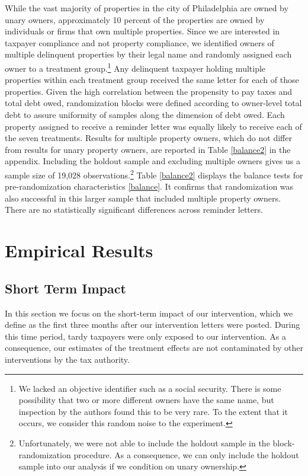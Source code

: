 \documentclass[12pt]{article}
\begin{document}
While the vast majority of properties in the city of Philadelphia are
owned by unary owners, approximately 10 percent of the properties are
owned by individuals or firms that own multiple properties. Since we
are interested in taxpayer compliance and not property compliance, we
identified owners of multiple delinquent properties by their legal
name and randomly assigned each owner to a treatment
group.\footnote{We lacked an objective identifier such as a social
  security.  There is some possibility that two or more different
  owners have the same name, but inspection by the authors found this
  to be very rare.  To the extent that it occurs, we consider this
  random noise to the experiment.} Any delinquent taxpayer holding
multiple properties within each treatment group received the same
letter for each of those properties.  Given the high correlation
between the propensity to pay taxes and total debt owed, randomization
blocks were defined according to owner-level total debt to assure
uniformity of samples along the dimension of debt owed. Each property
assigned to receive a reminder letter was equally likely to receive
each of the seven treatments. Results for multiple property owners,
which do not differ from results for unary property owners, are
reported in Table \ref{balance2} in the appendix.  Including the
holdout sample and excluding multiple owners gives us a sample size of
19,028 observations.\footnote{Unfortunately, we were not able to
  include the holdout sample in the block-randomization procedure. As
  a consequence, we can only include the holdout sample into our
  analysis if we condition on unary ownership.} Table \ref{balance2}
displays the balance tests for pre-randomization characteristics
\ref{balance}. It confirms that randomization was also successful in
this larger sample that included multiple property owners.  There are
no statistically significant differences across reminder letters.

\section{Empirical Results}

\subsection{Short Term Impact}

In this section we focus on the short-term impact of our intervention,
which we define as the first three months after our intervention
letters were posted. During this time period, tardy taxpayers were
only exposed to our intervention. As a consequence, our estimates of
the treatment effects are not contaminated by other interventions by
the tax authority.
\end{document}
